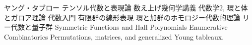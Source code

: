 \begin{thebibliography}{99}
   ヤング・タブロー
   テンソル代数と表現論
   数え上げ幾何学講義
   代数学2, 環と体とガロア理論
   代数入門
   有限群の線形表現
   環と加群のホモロジー代数的理論
  リー代数と量子群
   Symmetric Functions and Hall Polynomials
   Enumerative Combinatorics
   Permutations, matrices, and generalized Young tableaux.
\end{thebibliography}